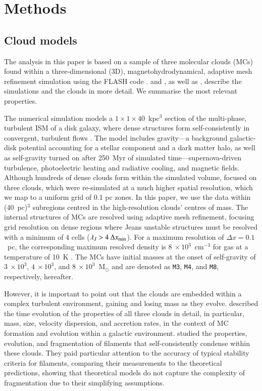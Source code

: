 \section{Methods}\label{methods}


\subsection{Cloud models}\label{methods:clouds}

The analysis in this paper is based on a sample of three molecular clouds (MCs) found within a three-dimensional (3D), magnetohydrodynamical, adaptive mesh refinement simulation using the FLASH code \citep{Fryxell2000}.  
 and , as well as \citet[ hereafter]{Chira2018}, describe the simulations and the clouds in more detail. 
We summarise the most relevant properties. 

The numerical simulation models a $1\times1\times40$~kpc$^3$ section of the multi-phase, turbulent ISM of a disk galaxy, where dense structures form self-consistently in convergent, turbulent flows .  
The model includes gravity---a background galactic-disk potential accounting for a stellar component and a dark matter halo, as well as self-gravity turned on after 250~Myr of simulated time---supernova-driven turbulence, photoelectric heating and radiative cooling, and magnetic fields. 
Although hundreds of dense clouds form within the simulated volume,  focused on three clouds, which were re-simulated at a much higher spatial resolution, which we map to a uniform grid of 0.1 pc zones.
In this paper, we use the data within (40~pc)$^{3}$ subregions centred in the high-resolution clouds' centres of mass.
The internal structures of MCs are resolved using adaptive mesh refinement, focusing grid resolution on dense regions where Jeans unstable structures must be resolved with a minimum of 4 cells ($\lambda_J > 4~\Delta x_{\rm min}$).
For a maximum resolution of $\Delta x = 0.1$~pc, the corresponding maximum resolved density is $8~\times 10^3$~cm$^{-3}$ for gas at a temperature of 10~K .
The MCs have initial masses at the onset of self-gravity of $3~\times 10^3$, $4~\times 10^3$, and $8~\times 10^3$~M$_{\odot}$ and are denoted as \texttt{M3}, \texttt{M4}, and \texttt{M8}, respectively, hereafter.

However, it is important to point out that the clouds are embedded within a complex turbulent environment, gaining and losing mass as they evolve.
 described the time evolution of the properties of all three clouds in detail, in particular, mass, size, velocity dispersion, and accretion rates, in the context of MC formation and evolution within a galactic environment.
 studied the properties, evolution, and fragmentation of filaments that self-consistently condense within these clouds. 
They paid particular attention to the accuracy of typical stability criteria for filaments, comparing their measurements to the theoretical predictions, showing that theoretical models do not capture the complexity of fragmentation due to their simplifying assumptions.


